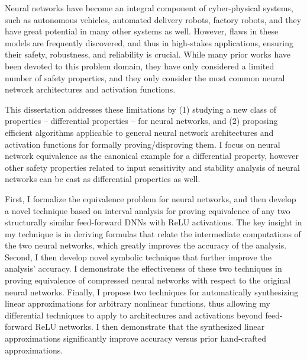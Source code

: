 Neural networks have become an integral component of cyber-physical systems, such
as autonomous vehicles, automated delivery robots, factory robots, and they have
great potential in many other systems as well. However, flaws in these models are
frequently discovered, and thus in high-stakes applications, ensuring their
safety, robustness, and reliability is crucial. While many prior works have been
devoted to this problem domain, they have only considered a limited number of
safety properties,
and they only consider the most common neural network
architectures and activation functions.

This dissertation addresses these limitations by (1) studying a new class of
properties -- differential properties -- for neural networks, and (2) proposing
efficient algorithms applicable to general neural network architectures and
activation functions for formally proving/disproving them. I
focus on neural network equivalence as the canonical example for a
differential property, however other safety properties related to input
sensitivity and stability analysis of neural networks can be cast as differential
properties as well.

First, I formalize the equivalence problem for neural networks, and then develop
a novel technique based on interval analysis for proving equivalence of any two
structurally similar feed-forward DNNs with ReLU activations. The key insight in
my technique is in deriving formulas that relate the intermediate computations of
the two neural networks, which greatly improves the accuracy of the analysis.
Second, I then develop novel symbolic technique that further improve the
analysis' accuracy. I demonstrate the effectiveness of these two techniques in
proving equivalence of compressed neural networks with respect to the original
neural networks. Finally, I propose two techniques for automatically synthesizing
linear approximations for arbitrary nonlinear functions, thus allowing my
differential techniques to apply to architectures and activations beyond
feed-forward ReLU networks. I then demonstrate that the synthesized linear
approximations significantly improve accuracy versus prior hand-crafted
approximations.